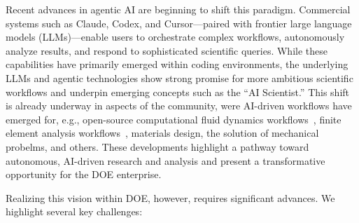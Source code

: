 \documentclass[11pt]{article} \usepackage[margin=1in]{geometry}
\begin{document}
Recent advances in agentic AI are beginning to shift this paradigm. Commercial
systems such as Claude, Codex, and Cursor—paired with frontier large language
models (LLMs)—enable users to orchestrate complex workflows, autonomously
analyze results, and respond to sophisticated scientific queries. While these
capabilities have primarily emerged within coding environments, the underlying
LLMs and agentic technologies show strong promise for more ambitious scientific workflows
and underpin emerging concepts such as the ``AI Scientist.'' This shift is
already underway in aspects of the community, were AI-driven workflows have
emerged for, e.g., open-source computational fluid dynamics workflows~\cite{},
finite element analysis workflows~\cite{}, materials design, the solution of
mechanical probelms, and others. These developments
highlight a pathway toward autonomous, AI-driven research and analysis and
present a transformative opportunity for the DOE enterprise. 

Realizing this vision within DOE, however, requires significant advances. We
highlight several key challenges:
\end{document}

